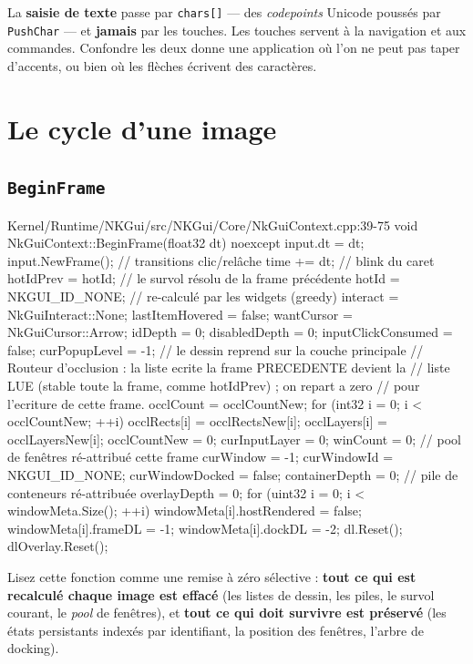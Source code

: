 \begin{nkretenir}
La \textbf{saisie de texte} passe par \texttt{chars[]} — des \emph{codepoints}
Unicode poussés par \texttt{PushChar} — et \textbf{jamais} par les touches. Les
touches servent à la navigation et aux commandes. Confondre les deux donne une
application où l'on ne peut pas taper d'accents, ou bien où les flèches écrivent
des caractères.
\end{nkretenir}

\section{Le cycle d'une image}

\subsection{\texttt{BeginFrame}}

\begin{nkcode}{Kernel/Runtime/NKGui/src/NKGui/Core/NkGuiContext.cpp:39-75}
void NkGuiContext::BeginFrame(float32 dt) noexcept {
    input.dt = dt;
    input.NewFrame();      // transitions clic/relâche
    time += dt;            // blink du caret
    hotIdPrev = hotId;     // le survol résolu de la frame précédente
    hotId = NKGUI_ID_NONE; // re-calculé par les widgets (greedy)
    interact = NkGuiInteract::None;
    lastItemHovered = false;
    wantCursor = NkGuiCursor::Arrow;
    idDepth = 0;
    disabledDepth = 0;
    inputClickConsumed = false;
    curPopupLevel = -1;    // le dessin reprend sur la couche principale
    // Routeur d'occlusion : la liste ecrite la frame PRECEDENTE devient la
    // liste LUE (stable toute la frame, comme hotIdPrev) ; on repart a zero
    // pour l'ecriture de cette frame.
    occlCount = occlCountNew;
    for (int32 i = 0; i < occlCountNew; ++i) { occlRects[i] = occlRectsNew[i]; occlLayers[i] = occlLayersNew[i]; }
    occlCountNew = 0;
    curInputLayer = 0;
    winCount = 0;          // pool de fenêtres ré-attribué cette frame
    curWindow = -1; curWindowId = NKGUI_ID_NONE; curWindowDocked = false;
    containerDepth = 0;    // pile de conteneurs ré-attribuée
    overlayDepth = 0;
    for (uint32 i = 0; i < windowMeta.Size(); ++i) {
        windowMeta[i].hostRendered = false;
        windowMeta[i].frameDL = -1;
        windowMeta[i].dockDL = -2;
    }
    dl.Reset();
    dlOverlay.Reset();
}
\end{nkcode}

Lisez cette fonction comme une remise à zéro sélective : \textbf{tout ce qui est
recalculé chaque image est effacé} (les listes de dessin, les piles, le survol
courant, le \emph{pool} de fenêtres), et \textbf{tout ce qui doit survivre est
préservé} (les états persistants indexés par identifiant, la position des
fenêtres, l'arbre de docking).

